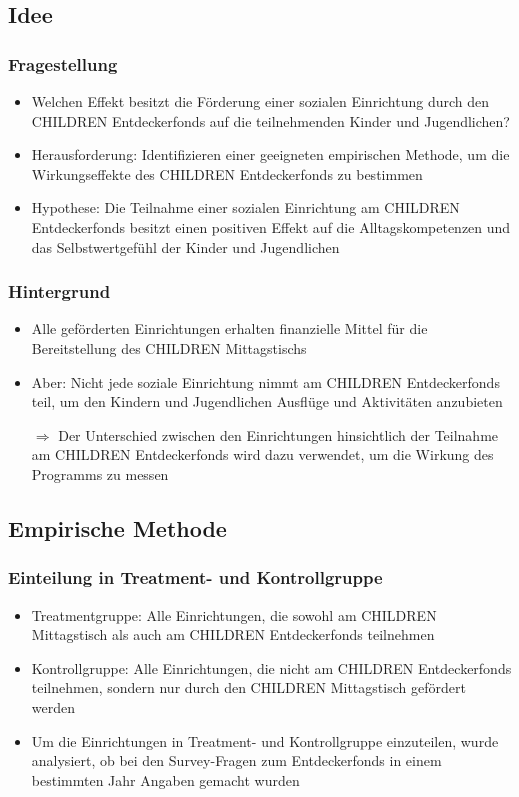 \subsection{Idee}

\begin{frame}[fragile]
\frametitle{Fragestellung}
\begin{itemize}
\item Welchen Effekt besitzt die Förderung einer sozialen Einrichtung durch den CHILDREN Entdeckerfonds auf die teilnehmenden Kinder und Jugendlichen?
\item Herausforderung: Identifizieren einer geeigneten empirischen Methode, um die Wirkungseffekte des CHILDREN Entdeckerfonds zu bestimmen
\linebreak
\item Hypothese: Die Teilnahme einer sozialen Einrichtung am CHILDREN Entdeckerfonds besitzt einen positiven Effekt auf die Alltagskompetenzen und das Selbstwertgefühl der Kinder und Jugendlichen
\end{itemize}
\end{frame}


\begin{frame}[fragile]
\frametitle{Hintergrund}
\begin{itemize}
\item Alle geförderten Einrichtungen erhalten finanzielle Mittel für die Bereitstellung des CHILDREN Mittagstischs
\item Aber: Nicht jede soziale Einrichtung nimmt am CHILDREN Entdeckerfonds teil, um den Kindern und Jugendlichen Ausflüge und Aktivitäten anzubieten
\linebreak
\item [$\Rightarrow$] Der Unterschied zwischen den Einrichtungen hinsichtlich der Teilnahme am CHILDREN Entdeckerfonds wird dazu verwendet, um die Wirkung des Programms zu messen
\end{itemize}
\end{frame}

\subsection{Empirische Methode}

\begin{frame}[fragile]
\frametitle{Einteilung in Treatment- und Kontrollgruppe}
\begin{itemize}
\item Treatmentgruppe: Alle Einrichtungen, die sowohl am CHILDREN Mittagstisch als auch am CHILDREN Entdeckerfonds teilnehmen
\item Kontrollgruppe: Alle Einrichtungen, die nicht am CHILDREN Entdeckerfonds teilnehmen, sondern nur durch den CHILDREN Mittagstisch gefördert werden
\item Um die Einrichtungen in Treatment- und Kontrollgruppe einzuteilen, wurde analysiert, ob bei den Survey-Fragen zum Entdeckerfonds in einem bestimmten Jahr Angaben gemacht wurden
\end{itemize}
\end{frame}

